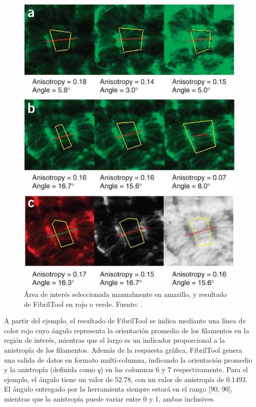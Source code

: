 \begin{figure}[h!]
        \centering
        \includegraphics[scale=0.6]{imagenes/fibritool.jpg}
        \caption[\'Area de inter\'es seleccionada manualmente en amarillo, y resultado de FibrilTool en rojo o verde.]{\'Area de inter\'es seleccionada manualmente en amarillo, y resultado de FibrilTool en rojo o verde. Fuente: \citet{boudaoud2014fibriltool}.}
        \label{fig:fibritool}
\end{figure}





A partir del ejemplo, el resultado de FibrilTool se indica mediante una l\'inea de color rojo cuyo \'angulo representa la orientaci\'on promedio de los filamentos en la regi\'on de inter\'es, mientras que el largo es un indicador proporcional a la anistrop\'ia de los filamentos. Adem\'as de la respuesta gr\'afica, FibrilTool genera una salida de datos en formato multi-columna, indicando la orientaci\'on promedio y la anistrop\'ia (definida como $q$) en las columnas 6 y 7 respectivamente. Para el ejemplo, el \'angulo tiene un valor de 52.78\textdegree, con un valor de anistrop\'ia de 0.1493. El \'angulo entregado por la herramienta siempre estar\'a en el rango [90, 90], mientras que la anistrop\'ia puede variar entre 0 y 1, ambos inclusives.

